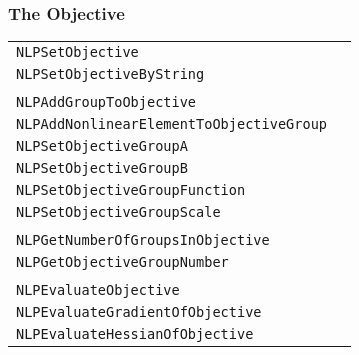 \documentclass[12pt]{article}
\begin{document}
\subsubsection{The Objective}

\begin{center}
\begin{tabular}{ll}
\tt NLPSetObjective&\pageref{Subroutine:NLPSetObjective}\\
\tt NLPSetObjectiveByString&\pageref{Subroutine:NLPSetObjectiveByString}\\
\\
\tt NLPAddGroupToObjective&\pageref{Subroutine:NLPAddGroupToObjective}\\
\tt NLPAddNonlinearElementToObjectiveGroup&\pageref{Subroutine:NLPAddNonlinearElementToObjectiveGroup}\\
\tt NLPSetObjectiveGroupA&\pageref{Subroutine:NLPSetObjectiveGroupA}\\
\tt NLPSetObjectiveGroupB&\pageref{Subroutine:NLPSetObjectiveGroupB}\\
\tt NLPSetObjectiveGroupFunction&\pageref{Subroutine:NLPSetObjectiveGroupFunction}\\
\tt NLPSetObjectiveGroupScale&\pageref{Subroutine:NLPSetObjectiveGroupScale}\\
\\
\tt NLPGetNumberOfGroupsInObjective&\pageref{Subroutine:NLPGetNumberOfGroupsInObjective}\\
\tt NLPGetObjectiveGroupNumber&\pageref{Subroutine:NLPGetObjectiveGroupNumber}\\
\\
\tt NLPEvaluateObjective&\pageref{Subroutine:NLPEvaluateObjective}\\
\tt NLPEvaluateGradientOfObjective&\pageref{Subroutine:NLPEvaluateGradientOfObjective}\\
\tt NLPEvaluateHessianOfObjective&\pageref{Subroutine:NLPEvaluateHessianOfObjective}\\
\end{tabular}
\end{center}
\end{document}
